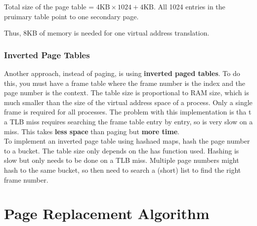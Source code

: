 \documentclass{article}
\newcommand{\bold}[1]{\textbf{#1}}
\begin{document}
Total size of the page table = $4\textrm{KB} \times 1024 + 4\textrm{KB}$. All 1024 entries in the pruimary table point to one secondary page. 

Thus, 8KB of memory is needed for one virtual address translation. 

\subsubsection{Inverted Page Tables}

Another approach, instead of paging, is using \bold{inverted paged tables}. To do this, you must have a frame table where the frame number is the index and the page number is the context. The table size is proportional to RAM size, which is much smaller than the size of the virtual address space of a process. Only a single frame is required for all processes. The problem with this implementation is tha t a TLB miss requires searching the frame table entry by entry, so is very slow on a miss. This takes \bold{less space} than paging but \bold{more time}. \\ 

To implement an inverted page table using hashaed maps, hash the page number to a bucket. The table size only depends on the has function used. Hashing is slow but only needs to be done on a TLB miss. Multiple page numbers might hash to the same bucket, so then need to search a (short) list to find the right frame number. 

\newpage
\section{Page Replacement Algorithm}
\end{document}
